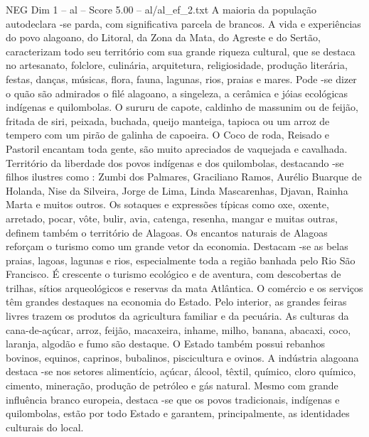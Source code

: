 \begin{textsample}{NEG Dim 1 – al – Score 5.00 – al/al\_ef\_2.txt}
A maioria da população autodeclara -se parda, com significativa parcela de brancos.
A vida e experiências do povo alagoano, do Litoral, da Zona da Mata, do Agreste e do Sertão, caracterizam todo seu território com sua grande riqueza cultural, que se destaca no artesanato, folclore, culinária, arquitetura, religiosidade, produção literária, festas, danças, músicas, flora, fauna, lagunas, rios, praias e mares.
Pode -se dizer o quão são admirados o filé alagoano, a singeleza, a cerâmica e jóias ecológicas indígenas e quilombolas.
O sururu de capote, caldinho de massunim ou de feijão, fritada de siri, peixada, buchada, queijo manteiga, tapioca ou um arroz de tempero com um pirão de galinha de capoeira.
O Coco de roda, Reisado e Pastoril encantam toda gente, são muito apreciados de vaquejada e cavalhada.
Território da liberdade dos povos indígenas e dos quilombolas, destacando -se filhos ilustres como : Zumbi dos Palmares, Graciliano Ramos, Aurélio Buarque de Holanda, Nise da Silveira, Jorge de Lima, Linda Mascarenhas, Djavan, Rainha Marta e muitos outros.
Os sotaques e expressões típicas como oxe, oxente, arretado, pocar, vôte, bulir, avia, catenga, resenha, mangar e muitas outras, definem também o território de Alagoas.
Os encantos naturais de Alagoas reforçam o turismo como um grande vetor da economia.
Destacam -se as belas praias, lagoas, lagunas e rios, especialmente toda a região banhada pelo Rio São Francisco.
É crescente o turismo ecológico e de aventura, com descobertas de trilhas, sítios arqueológicos e reservas da mata Atlântica.
O comércio e os serviços têm grandes destaques na economia do Estado.
Pelo interior, as grandes feiras livres trazem os produtos da agricultura familiar e da pecuária.
As culturas da cana-de-açúcar, arroz, feijão, macaxeira, inhame, milho, banana, abacaxi, coco, laranja, algodão e fumo são destaque.
O Estado também possui rebanhos bovinos, equinos, caprinos, bubalinos, piscicultura e ovinos.
A indústria alagoana destaca -se nos setores alimentício, açúcar, álcool, têxtil, químico, cloro químico, cimento, mineração, produção de petróleo e gás natural.
Mesmo com grande influência branco europeia, destaca -se que os povos tradicionais, indígenas e quilombolas, estão por todo Estado e garantem, principalmente, as identidades culturais do local.

\end{textsample}
